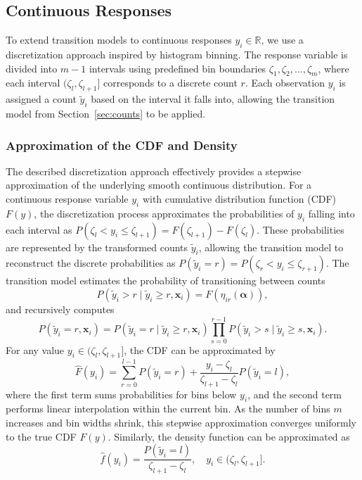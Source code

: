 \documentclass[english,a4paper,11pt]{article}
\begin{document}
\subsection{Continuous Responses} \label{sec:continuous}

To extend transition models to continuous responses $y_i \in \mathbb{R}$, we use a
discretization approach inspired by histogram binning. The response variable is divided
into $m - 1$ intervals using predefined bin boundaries $\zeta_1, \zeta_2, \dots, \zeta_m$,
where each interval $(\zeta_l, \zeta_{l+1}]$ corresponds to a discrete count $r$. Each observation
$y_i$ is assigned a count $\tilde{y}_i$ based on the interval it falls into, allowing the
transition model from Section~\ref{sec:counts} to be applied.

\subsubsection{Approximation of the CDF and Density}

The described discretization approach effectively provides a stepwise approximation of the
underlying smooth continuous distribution. For a continuous response variable $y_i$ with
cumulative distribution function (CDF) $F(y)$, the discretization process approximates the
probabilities of $y_i$ falling into each interval as
$P(\zeta_l < y_i \leq \zeta_{l+1}) = F(\zeta_{l+1}) - F(\zeta_l)$.
These probabilities are represented by the transformed counts $\tilde{y}_i$, allowing the
transition model to reconstruct the discrete probabilities as
$P(\tilde{y}_i = r) = P(\zeta_r < y_i \leq \zeta_{r+1})$.
The transition model estimates the probability of transitioning between counts
$$
P(\tilde{y}_i > r \mid \tilde{y}_i \geq r, \mathbf{x}_i) = F(\eta_{ir}(\boldsymbol{\alpha})),
$$
and recursively computes
$$
P(\tilde{y}_i = r, \mathbf{x}_i) = P(\tilde{y}_i = r \mid \tilde{y}_i \geq r, \mathbf{x}_i) \prod_{s=0}^{r-1} P(\tilde{y}_i > s \mid \tilde{y}_i \geq s, \mathbf{x}_i).
$$
For any value $y_i \in (\zeta_l, \zeta_{l+1}]$, the CDF can be approximated by
$$
\hat{F}(y_i) = \sum_{r=0}^{l-1} P(\tilde{y}_i = r) + \frac{y_i - \zeta_l}{\zeta_{l+1} - \zeta_l} P(\tilde{y}_i = l),
$$
where the first term sums probabilities for bins below $y_i$, and the second term performs
linear interpolation within the current bin. As the number of bins $m$ increases and bin
widths shrink, this stepwise approximation converges uniformly to the true CDF $F(y)$.
Similarly, the density function can be approximated as
$$
\hat{f}(y_i) = \frac{P(\tilde{y}_i = l)}{\zeta_{l+1} - \zeta_l}, \quad y_i \in (\zeta_l, \zeta_{l+1}].
$$
\end{document}
